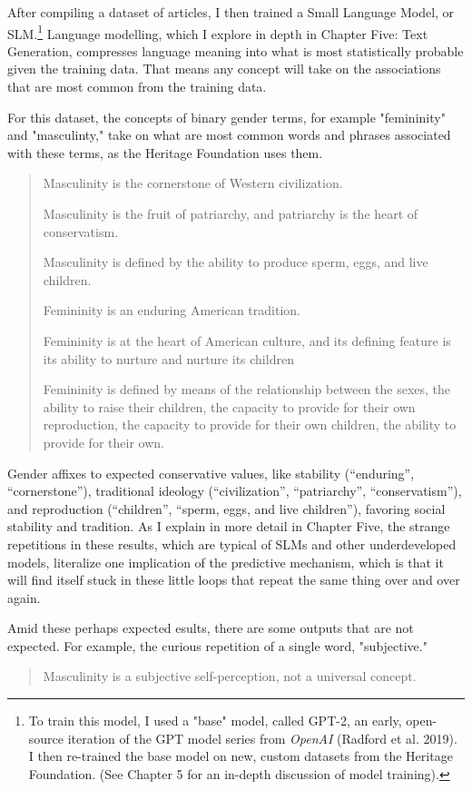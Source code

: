 \documentclass[11pt]{article}
\begin{document}
\begin{enumerate}
After compiling a dataset of articles, I then trained a Small Language
Model, or SLM.\footnote{To train this model, I used a "base" model, called GPT-2, an
early, open-source iteration of the GPT model series from \emph{OpenAI}
(Radford et al. 2019). I then re-trained the base model on new, custom
datasets from the Heritage Foundation. (See Chapter 5 for an in-depth
discussion of model training).} Language modelling, which I explore in depth in
Chapter Five: Text Generation, compresses language meaning into what
is most statistically probable given the training data. That means any
concept will take on the associations that are most common from the
training data.

For this dataset, the concepts of binary gender terms, for example
"femininity" and "masculinty," take on what are most common words and
phrases associated with these terms, as the Heritage Foundation uses
them. 
\begin{quote}
Masculinity is the cornerstone of Western civilization.

Masculinity is the fruit of patriarchy, and patriarchy is the heart of
conservatism.

Masculinity is defined by the ability to produce sperm, eggs, and live
children.

Femininity is an enduring American tradition.

Femininity is at the heart of American culture, and its defining
feature is its ability to nurture and nurture its children

Femininity is defined by means of the relationship between the sexes,
the ability to raise their children, the capacity to provide for their
own reproduction, the capacity to provide for their own children, the
ability to provide for their own.
\end{quote}
Gender affixes to expected conservative values, like stability
(“enduring”, “cornerstone”), traditional ideology (“civilization”,
“patriarchy”, “conservatism”), and reproduction (“children”, “sperm,
eggs, and live children”), favoring social stability and tradition. As
I explain in more detail in Chapter Five, the strange repetitions in
these results, which are typical of SLMs and other underdeveloped
models, literalize one implication of the predictive mechanism, which
is that it will find itself stuck in these little loops that repeat
the same thing over and over again.

Amid these perhaps expected esults, there are some outputs that are
not expected. For example, the curious repetition of a single word,
"subjective."
\begin{quote}
Masculinity is a subjective self-perception, not a universal concept.


\end{quote}
\end{enumerate}
\end{document}
